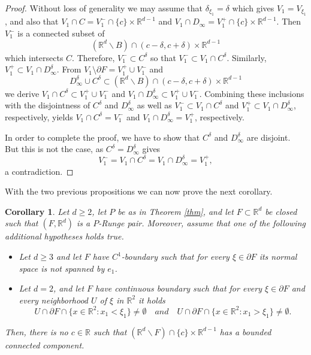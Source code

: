 \documentclass[10pt,leqno]{amsart}
\newtheorem{corollary}[prop]{Corollary}
\theoremstyle{definition}
\newcommand{\R}{\mathbb R}
\begin{document}
\begin{proof}
Without loss of generality we may assume that $\delta_{\xi_1}=\delta$ which gives $V_1=V_{\xi_1}$, and also that $V_1\cap C=V_1^-\cap\{c\}\times\R^{d-1}$ and $V_1\cap D_\infty=V_1^+\cap\{c\}\times\R^{d-1}$. Then $V_1^-$ is a connected subset of 
$$(\R^d\backslash B)\cap (c-\delta,c+\delta)\times\R^{d-1}$$ which intersects $C$. Therefore, $V_1^-\subset C^\delta$ so that $V_1^-\subset V_1\cap C^\delta$. Similarly, $V_1^+\subset V_1\cap D_\infty^\delta$. From $V_1\setminus\partial F=V_1^+\cup V_1^-$ and
$$D_\infty^\delta\cup C^\delta\subset (\R^d\backslash B)\cap (c-\delta,c+\delta)\times\R^{d-1}$$
we derive $V_1\cap C^\delta\subset V_1^+\cup V_1^-$ and $V_1\cap D_\infty^\delta\subset V_1^+\cup V_1^-$. Combining these inclusions with the disjointness of $C^\delta$ and $D_\infty^\delta$ as well as  $V_1^-\subset V_1\cap C^\delta$ and $V_1^+\subset V_1\cap D_\infty^\delta$, respectively, yields $V_1\cap C^\delta=V_1^-$ and $V_1\cap D_\infty^\delta=V_1^+$, respectively.

In order to complete the proof, we have to show that $C^\delta$ and $D_\infty^\delta$ are disjoint. But this is not the case, as $C^\delta=D_\infty^\delta$ gives
$$V_1^-=V_1\cap C^\delta=V_1\cap D_\infty^\delta=V_1^+,$$
a contradiction. 
\end{proof}

With the two previous propositions we can now prove the next corollary.

\begin{corollary}\label{corollary:improvement of thm}
	Let $d\geq 2$, let $P$ be as in Theorem \ref{thm}, and let $F\subset\R^d$ be closed such that $(F, \R^d)$ is a $P$-Runge pair. Moreover, assume that one of the following additional hypotheses holds true.
	\begin{itemize}
		\item[(a)] Let $d\geq 3$ and let $F$ have $C^1$-boundary such that for every $\xi\in\partial F$ its normal space is not spanned by $e_1$.
		\item[(b)] Let $d=2$, and let $F$ have continuous boundary such that for every $\xi\in\partial F$ and every neighborhood $U$ of $\xi$ in $\R^2$ it holds
		$$U\cap \partial F\cap\{x\in \R^2: x_1 <\xi_1\}\neq \emptyset \quad\textit{and}\quad U\cap \partial F\cap\{x\in \R^2: x_1 >\xi_1\}\neq \emptyset.$$
	\end{itemize}
	Then, there is no $c\in\R$ such that $(\R^d\backslash F)\cap \{c\}\times\R^{d-1}$ has a bounded connected component.
\end{corollary}
\end{document}

